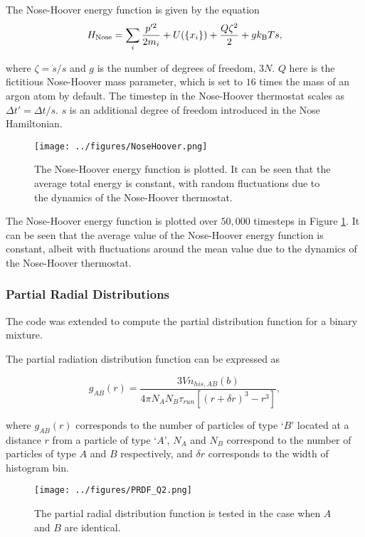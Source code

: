 \documentclass{article}
\begin{document}
The Nose-Hoover energy function is given by the equation
\begin{equation}
H_{\rm{Nose}} = \sum_{i}\frac{p'^2}{2m_i} + U(\{x_i\}) + \frac{Q\zeta^2}{2} + gk_{\rm{B}}Ts,
\end{equation}
 
where $\zeta = \dot{s}/s$ and $g$ is the number of degrees of freedom, $3N$. $Q$ here is the fictitious Nose-Hoover mass parameter, which is set to $16$ times the mass of an argon atom by default. The timestep in the Nose-Hoover thermostat scales as $\Delta t' = \Delta t/s$. $s$ is an additional degree of freedom introduced in the Nose Hamiltonian. 

\begin{figure}[h]
    \centering
    \texttt{[image: ../figures/NoseHoover.png]}
    \caption{The Nose-Hoover energy function is plotted. It can be seen that the average total energy is constant, with random fluctuations due to the dynamics of the Nose-Hoover thermostat. \label{fig:NoseHoover}}
\end{figure}

The Nose-Hoover energy function is plotted over $50,000$ timesteps in Figure \ref{fig:NoseHoover}. It can be seen that the average value of the Nose-Hoover energy function is constant, albeit with fluctuations around the mean value due to the dynamics of the Nose-Hoover thermostat.
 
\subsubsection{Partial Radial Distributions}

The code was extended to compute the partial distribution function for a binary mixture.

The partial radiation distribution \cite{AllenTildesley} function can be expressed as 

\begin{equation}
g_{AB}(r) = \frac{3Vn_{his,AB}(b)}{4\pi N_A N_B \tau_{run}[(r+\delta r)^3 - r^3]},
\end{equation}

where $g_{AB}(r)$ corresponds to the number of particles of type `$B$' located at a distance $r$ from a particle of type `$A$', $N_A$ and $N_B$ correspond to the number of particles of type $A$ and $B$ respectively, and $\delta r$ corresponds to the width of histogram bin.

\begin{figure}[h]
    \centering
    \texttt{[image: ../figures/PRDF\_Q2.png]}
    \caption{The partial radial distribution function is tested in the case when $A$ and $B$ are identical. \label{fig:PRDFTest}}
\end{figure}
\end{document}
